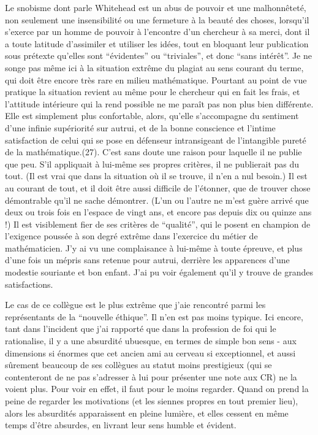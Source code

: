 {Le snobisme dont parle Whitehead est un abus de pouvoir et une malhonnêteté, non seulement une insensibilité ou une fermeture à la beauté des choses, lorsqu'il s'exerce par un homme de pouvoir à l'encontre d'un chercheur à sa merci, dont il a toute latitude d'assimiler et utiliser les idées, tout en bloquant leur publication sous prétexte qu'elles sont ``évidentes'' ou ``triviales'', et donc ``sans intérêt''. Je ne songe pas même ici à la situation extrême du plagiat au sens courant du terme, qui doit être encore très rare en milieu mathématique. Pourtant au point de vue pratique la situation revient au même pour le chercheur qui en fait les frais, et l'attitude intérieure qui la rend possible ne me paraît pas non plus bien différente. Elle est simplement plus confortable, alors, qu'elle s'accompagne du sentiment d'une infinie supériorité sur autrui, et de la bonne conscience et l'intime satisfaction de celui qui se pose en défenseur intransigeant de l'intangible pureté de la mathématique.}(27). C'est sans doute une raison pour laquelle il ne publie que peu. S'il appliquait à lui-même ses propres critères, il ne publierait pas du tout. (Il est vrai que dans la situation où il se trouve, il n'en a nul besoin.) Il est au courant de tout, et il doit être aussi difficile de l'étonner, que de trouver chose démontrable qu'il ne sache démontrer. (L'un ou l'autre ne m'est guère arrivé que deux ou trois fois en l'espace de vingt ans, et encore pas depuis dix ou quinze ans !) Il est visiblement fier de ses critères de ``qualité'', qui le posent en champion de l'exigence poussée à son degré extrême dans l'exercice du métier de mathématicien. J'y ai vu une complaisance à lui-même à toute épreuve, et plus d'une fois un mépris sans retenue pour autrui, derrière les apparences d'une modestie souriante et bon enfant. J'ai pu voir également qu'il y trouve de grandes satisfactions.

Le cas de ce collègue est le plus extrême que j'aie rencontré parmi les représentants de la ``nouvelle éthique''. Il n'en est pas moins typique. Ici encore, tant dans l'incident que j'ai rapporté que dans la profession de foi qui le rationalise, il y a une absurdité ubuesque, en termes de simple bon sens - aux dimensions si énormes que cet ancien ami au cerveau si exceptionnel, et aussi sûrement beaucoup de ses collègues au statut moins prestigieux (qui se contenteront de ne pas s'adresser à lui pour présenter une note aux CR) ne la voient plus. Pour voir en effet, il faut pour le moins regarder. Quand on prend la peine de regarder les motivations (et les siennes propres en tout premier lieu), alors les absurdités apparaissent en pleine lumière, et elles cessent en même temps d'être absurdes, en livrant leur sens humble et évident.

